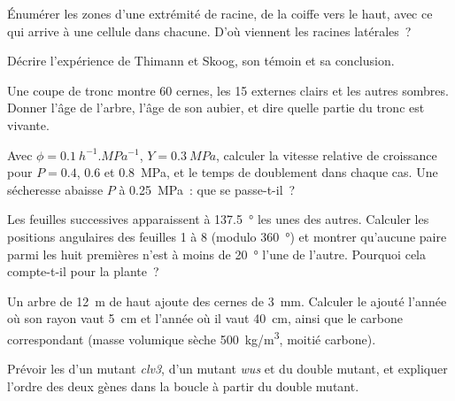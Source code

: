 \begin{exercise}[$\star$]\label{exo:b2:plant-meristems:2}
Énumérer les zones d'une extrémité de racine, de la coiffe vers le
haut, avec ce qui arrive à une cellule dans chacune. D'où viennent les
racines latérales~?
\end{exercise}

\begin{exercise}[$\star$]\label{exo:b2:plant-meristems:3}
Décrire l'expérience de Thimann et Skoog, son témoin et sa conclusion.
\end{exercise}

\begin{exercise}[$\star$]\label{exo:b2:plant-meristems:4}
Une coupe de tronc montre 60 cernes, les 15 externes clairs et les autres
sombres. Donner l'âge de l'arbre, l'âge de son aubier, et dire quelle
partie du tronc est vivante.
\end{exercise}

\begin{exercise}[$\star\star$]\label{exo:b2:plant-meristems:5}
Avec $\phi = \qty{0.1}{h^{-1}.MPa^{-1}}$, $Y = \qty{0.3}{MPa}$, calculer
la vitesse relative de croissance pour $P = 0.4$, $0.6$ et
\qty{0.8}{MPa}, et le temps de doublement dans chaque cas. Une
sécheresse abaisse $P$ à \qty{0.25}{MPa}~: que se passe-t-il~?
\end{exercise}

\begin{exercise}[$\star\star$]\label{exo:b2:plant-meristems:6}
Les feuilles successives apparaissent à \qty{137.5}{\degree} les unes
des autres. Calculer les positions angulaires des feuilles 1 à 8 (modulo
\qty{360}{\degree}) et montrer qu'aucune paire parmi les huit premières
n'est à moins de \qty{20}{\degree} l'une de l'autre. Pourquoi cela
compte-t-il pour la plante~?
\end{exercise}

\begin{exercise}[$\star\star$]\label{exo:b2:plant-meristems:7}
Un arbre de \qty{12}{m} de haut ajoute des cernes de \qty{3}{mm}.
Calculer le  ajouté l'année où son rayon vaut \qty{5}{cm} et l'année
où il vaut \qty{40}{cm}, ainsi que le carbone correspondant (masse
volumique sèche \qty{500}{kg/m^3}, moitié carbone).
\end{exercise}

\begin{exercise}[$\star\star$]\label{exo:b2:plant-meristems:8}
Prévoir les  d'un mutant \emph{clv3}, d'un mutant \emph{wus}
et du double mutant, et expliquer l'ordre des deux gènes dans la boucle
à partir du double mutant.
\end{exercise}

